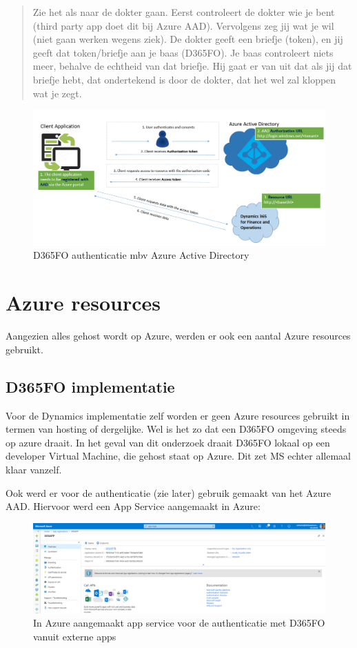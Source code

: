 \begin{quotation}
    Zie het als naar de dokter gaan. Eerst controleert de dokter wie je bent (third party app doet dit bij Azure AAD). Vervolgens zeg jij wat je wil (niet gaan werken wegens ziek). De dokter geeft een briefje (token), en jij geeft dat token/briefje aan je baas (D365FO). Je baas controleert niets meer, behalve de echtheid van dat briefje. Hij gaat er van uit dat als jij dat briefje hebt, dat ondertekend is door de dokter, dat het wel zal kloppen wat je zegt.
\end{quotation}


\begin{figure}[H]
    \centering
    \includegraphics[width=1\textwidth]{img/aadAuthenticationArchitecture.png}
    \caption{D365FO authenticatie mbv Azure Active Directory}
\end{figure}
\section{Azure resources}
Aangezien alles gehost wordt op Azure, werden er ook een aantal Azure resources gebruikt. 

\subsection{D365FO implementatie}
Voor de Dynamics implementatie zelf worden er geen Azure resources gebruikt in termen van hosting of dergelijke. Wel is het zo dat een D365FO omgeving steeds op azure draait. In het geval van dit onderzoek draait D365FO lokaal op een developer Virtual Machine, die gehost staat op Azure. Dit zet MS echter allemaal klaar vanzelf. 

Ook werd er voor de authenticatie (zie later) gebruik gemaakt van het Azure AAD. Hiervoor werd een App Service aangemaakt in Azure: 

\begin{figure}[H]
    \centering
    \includegraphics[width=1\textwidth]{img/appRegistrationD365fo.png}
    \caption{In Azure aangemaakt app service voor de authenticatie met D365FO vanuit externe apps}
\end{figure}

